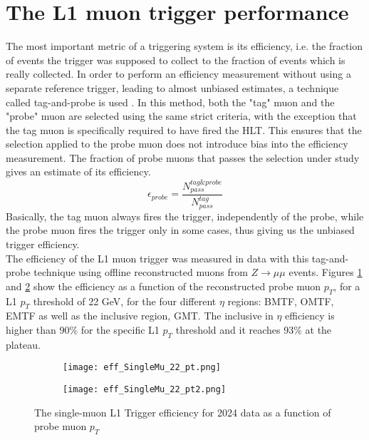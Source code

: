\section{\label{sec:exp_CMS_8}The L1 muon trigger performance}
\noindent The most important metric of a triggering system is its efficiency, i.e. the fraction of events the trigger was supposed to collect to the fraction of events which is really collected. In order to perform an efficiency measurement without using a separate reference trigger, leading to almost unbiased estimates, a technique called tag-and-probe is used \cite{Muon_2012}. In this method, both the "tag" muon and the "probe" muon are selected using the same strict criteria, with the exception that the tag muon is specifically required to have fired the HLT. This ensures that the selection applied to the probe muon does not introduce bias into the efficiency measurement. The fraction of probe muons that passes the selection under study gives an estimate of its efficiency.
\begin{equation}
    \epsilon_{probe} = \frac{N_{pass}^{tag\&probe}}{N_{pass}^{tag}}
\end{equation}
Basically, the tag muon always fires the trigger, independently of the probe, while the probe muon fires the trigger only in some cases, thus giving us the unbiased trigger efficiency.\\
\indent The efficiency of the L1 muon trigger was measured in data with this tag-and-probe technique using offline reconstructed muons from $Z \rightarrow \mu\mu$ events. Figures \ref{subfig:eff_pt} and \ref{subfig:eff_pt2} show the efficiency as a function of the reconstructed probe muon $p_T$, for a L1 $p_T$ threshold of 22 GeV, for the four different $\eta$ regions: BMTF, OMTF, EMTF as well as the inclusive region, GMT. The inclusive in $\eta$ efficiency is higher than 90\% for the specific L1 $p_T$ threshold and it reaches 93\% at the plateau.
\begin{figure}[H]
    \centering
    \begin{subfigure}{0.48\textwidth}
        \texttt{[image: eff\_SingleMu\_22\_pt.png]}
        \caption{}
        \label{subfig:eff_pt}
    \end{subfigure}
    \begin{subfigure}{0.48\textwidth}
        \texttt{[image: eff\_SingleMu\_22\_pt2.png]}
        \caption{}
        \label{subfig:eff_pt2}        
    \end{subfigure} 
    \caption{The single-muon L1 Trigger efficiency for 2024 data as a function of probe muon $p_T$}
    \label{fig:eff_pt}
\end{figure}
